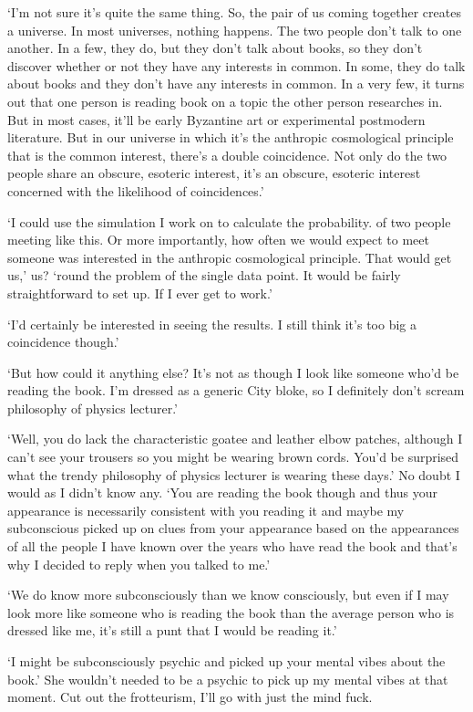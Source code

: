 `I'm not sure it's quite the same thing. So, the pair of us coming
together creates a universe. In most universes, nothing happens. The
two people don't talk to one another. In a few, they do, but they
don't talk about books, so they don't discover whether or not they
have any interests in common. In some, they do talk about books and
they don't have any interests in common. In a very few, it turns out
that one person is reading book on a topic the other person
researches in. But in most cases, it'll be early Byzantine art or
experimental postmodern literature. But in our universe in which
it's the anthropic cosmological principle that is the common
interest, there's a double coincidence. Not only do the two people
share an obscure, esoteric interest, it's an obscure, esoteric
interest concerned with the likelihood of coincidences.'

`I could use the simulation I work on to calculate the probability.
of two people meeting like this. Or more importantly, how often we
would expect to meet someone was interested in the anthropic
cosmological principle. That would get us,' us? `round the problem
of the single data point. It would be fairly straightforward to set
up. If I ever get to work.'

`I'd certainly be interested in seeing the results. I still think
it's too big a coincidence though.'

`But how could it anything else? It's not as though I look like
someone who'd be reading the book. I'm dressed as a generic City
bloke, so I definitely don't scream philosophy of physics
lecturer.'

`Well, you do lack the characteristic goatee and leather elbow
patches, although I can't see your trousers so you might be wearing
brown cords. You'd be surprised what the trendy philosophy of
physics lecturer is wearing these days.' No doubt I would as I
didn't know any. `You are reading the book though and thus your
appearance is necessarily consistent with you reading it and maybe
my subconscious picked up on clues from your appearance based on the
appearances of all the people I have known over the years who have
read the book and that's why I decided to reply when you talked to
me.'

`We do know more subconsciously than we know consciously, but even
if I may look more like someone who is reading the book than the
average person who is dressed like me, it's still a punt that I
would be reading it.'

`I might be subconsciously psychic and picked up your mental vibes
about the book.' She wouldn't needed to be a psychic to pick up my
mental vibes at that moment. Cut out the frotteurism, I'll go with
just the mind fuck.

